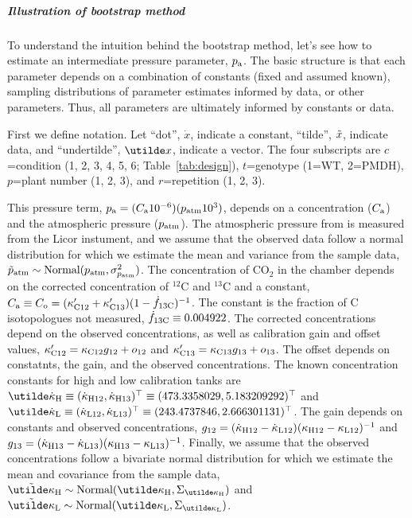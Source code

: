 \subparagraph{Illustration of bootstrap method}
To understand the intuition behind the bootstrap method,
  let's see how to estimate an intermediate pressure parameter, $p_{\textrm{a}}$.
The basic structure is that each parameter depends on a combination of
  constants (fixed and assumed known),
  sampling distributions of parameter estimates informed by data,
  or other parameters.
Thus, all parameters are ultimately informed by constants or data.

First we define notation.
Let ``dot'', $\dot{x}$, indicate a constant,
  ``tilde'', $\tilde{x}$, indicate data, and
  ``undertilde'', $\vector{x}$, indicate a vector.
The four subscripts are
  $c$=condition (1, 2, 3, 4, 5, 6; Table~\ref{tab:design}),
  $t$=genotype (1=WT, 2=PMDH),
  $p$=plant number (1, 2, 3), and
  $r$=repetition (1, 2, 3).

This pressure term,
  $p_{\textrm{a}} = (C_{\textrm{a}} 10^{-6})(p_{\textrm{atm}} 10^3)$,
  depends on a concentration ($C_{\textrm{a}}$) and the atmospheric pressure ($p_{\textrm{atm}}$).
The atmospheric pressure from is measured from the Licor instument,
  and we assume that the observed data follow a normal distribution
  for which we estimate the mean and variance from the sample data,
    $\tilde{p}_{\textrm{atm}} \sim \textrm{Normal}(p_{\textrm{atm}},\sigma_{p_{\textrm{atm}}}^2)$.
The concentration of CO$_2$ in the chamber depends on
  the corrected concentration of $^{12}$C and $^{13}$C and a constant,
  $C_{\textrm{a}} \equiv C_{\textrm{o}} = (\kappa_{\textrm{C}12}^{\prime}+\kappa_{\textrm{C}13}^{\prime})(1-\dot{f}_{\textrm{13C}})^{-1}$.
The constant is the fraction of C isotopologues not measured, $\dot{f}_{\textrm{13C}}\equiv 0.004922$.
The corrected concentrations depend on the observed concentrations,
  as well as calibration gain and offset values,
  $\kappa_{\textrm{C}12}^{\prime} = \kappa_{\textrm{C}12}g_{\textrm{12}} + o_{\textrm{12}}$ and
  $\kappa_{\textrm{C}13}^{\prime} = \kappa_{\textrm{C}13}g_{\textrm{13}} + o_{\textrm{13}}$.
The offset depends on constatnts, the gain, and the observed concentrations.
The known concentration constants for high and low calibration tanks are
  $\vdotkappaHtw
    \equiv (\sdotkappaHtw, \sdotkappaHth)^\transpose
    \equiv (473.3358029, 5.183209292)^\transpose      $ and
  $\vdotkappaLtw
    \equiv (\sdotkappaLtw, \sdotkappaLth)^\transpose
    \equiv (243.4737846, 2.666301131)^\transpose      $.
The gain depends on constants and observed concentrations,
  $g_{\textrm{12}} = (\dot{\kappa}_{\textrm{H}12} - \dot{\kappa}_{\textrm{L}12})(\kappa_{\textrm{H}12} - \kappa_{\textrm{L}12})^{-1}$ and
  $g_{\textrm{13}} = (\dot{\kappa}_{\textrm{H}13} - \dot{\kappa}_{\textrm{L}13})(\kappa_{\textrm{H}13} - \kappa_{\textrm{L}13})^{-1}$.
Finally, we assume that the observed concentrations follow a bivariate normal distribution
  for which we estimate the mean and covariance from the sample data,
  $\vdatakappaH \sim \Normal(\vkappaH,\vsigkappaH)$ and
  $\vdatakappaL \sim \Normal(\vkappaL,\vsigkappaL)$.

